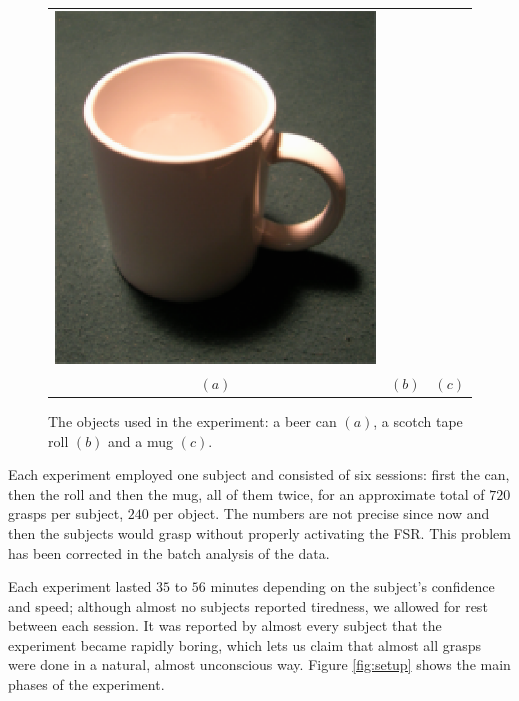 \begin{figure}[htbp]
\begin{center}
\begin{tabular}{ccc}
      \includegraphics[height=0.2\textheight]{mug.eps} \\
      $(a)$ & $(b)$ & $(c)$
    \end{tabular}
    \caption{The objects used in the experiment: a beer can $(a)$, a
    scotch tape roll $(b)$ and a mug $(c)$.}
    \label{fig:objects}
  \end{center}
\end{figure}

Each experiment employed one subject and consisted of six sessions:
first the can, then the roll and then the mug, all of them twice,
for an approximate total of $720$ grasps per subject, $240$ per
object. The numbers are not precise since now and then the subjects
would grasp without properly activating the FSR. This problem has been
corrected in the batch analysis of the data.

Each experiment lasted $35$ to $56$ minutes depending on the subject's
confidence and speed; although almost no subjects reported tiredness,
we allowed for rest between each session. It was reported by almost
every subject that the experiment became rapidly boring, which lets us
claim that almost all grasps were done in a natural, almost
unconscious way. Figure \ref{fig:setup} shows the main phases of the
experiment.

